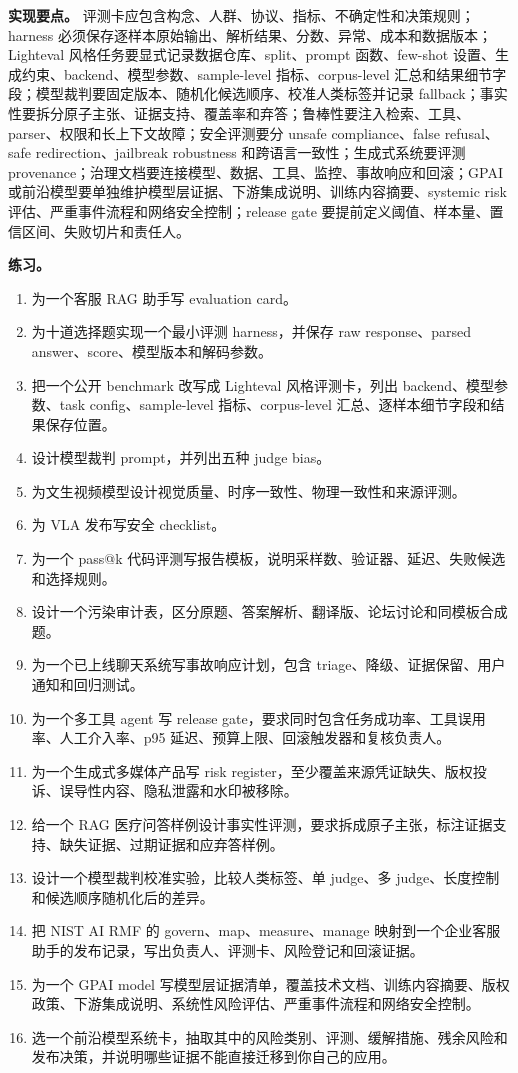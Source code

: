 \documentclass[UTF8,zihao=-4,openany]{ctexbook}
\begin{document}
\textbf{实现要点。} 评测卡应包含构念、人群、协议、指标、不确定性和决策规则；harness 必须保存逐样本原始输出、解析结果、分数、异常、成本和数据版本；Lighteval 风格任务要显式记录数据仓库、split、prompt 函数、few-shot 设置、生成约束、backend、模型参数、sample-level 指标、corpus-level 汇总和结果细节字段；模型裁判要固定版本、随机化候选顺序、校准人类标签并记录 fallback；事实性要拆分原子主张、证据支持、覆盖率和弃答；鲁棒性要注入检索、工具、parser、权限和长上下文故障；安全评测要分 unsafe compliance、false refusal、safe redirection、jailbreak robustness 和跨语言一致性；生成式系统要评测 provenance；治理文档要连接模型、数据、工具、监控、事故响应和回滚；GPAI 或前沿模型要单独维护模型层证据、下游集成说明、训练内容摘要、systemic risk 评估、严重事件流程和网络安全控制；release gate 要提前定义阈值、样本量、置信区间、失败切片和责任人。

\textbf{练习。}
\begin{enumerate}
\item 为一个客服 RAG 助手写 evaluation card。
\item 为十道选择题实现一个最小评测 harness，并保存 raw response、parsed answer、score、模型版本和解码参数。
\item 把一个公开 benchmark 改写成 Lighteval 风格评测卡，列出 backend、模型参数、task config、sample-level 指标、corpus-level 汇总、逐样本细节字段和结果保存位置。
\item 设计模型裁判 prompt，并列出五种 judge bias。
\item 为文生视频模型设计视觉质量、时序一致性、物理一致性和来源评测。
\item 为 VLA 发布写安全 checklist。
\item 为一个 pass@k 代码评测写报告模板，说明采样数、验证器、延迟、失败候选和选择规则。
\item 设计一个污染审计表，区分原题、答案解析、翻译版、论坛讨论和同模板合成题。
\item 为一个已上线聊天系统写事故响应计划，包含 triage、降级、证据保留、用户通知和回归测试。
\item 为一个多工具 agent 写 release gate，要求同时包含任务成功率、工具误用率、人工介入率、p95 延迟、预算上限、回滚触发器和复核负责人。
\item 为一个生成式多媒体产品写 risk register，至少覆盖来源凭证缺失、版权投诉、误导性内容、隐私泄露和水印被移除。
\item 给一个 RAG 医疗问答样例设计事实性评测，要求拆成原子主张，标注证据支持、缺失证据、过期证据和应弃答样例。
\item 设计一个模型裁判校准实验，比较人类标签、单 judge、多 judge、长度控制和候选顺序随机化后的差异。
\item 把 NIST AI RMF 的 govern、map、measure、manage 映射到一个企业客服助手的发布记录，写出负责人、评测卡、风险登记和回滚证据。
\item 为一个 GPAI model 写模型层证据清单，覆盖技术文档、训练内容摘要、版权政策、下游集成说明、系统性风险评估、严重事件流程和网络安全控制。
\item 选一个前沿模型系统卡，抽取其中的风险类别、评测、缓解措施、残余风险和发布决策，并说明哪些证据不能直接迁移到你自己的应用。
\end{enumerate}
\end{document}
